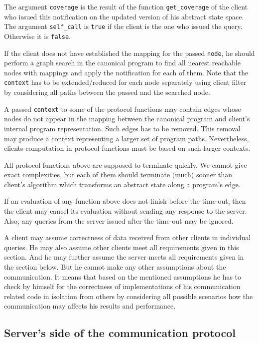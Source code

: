 \documentclass[envcountsame]{llncs}
\begin{document}
The argument \texttt{coverage} is the result of the function
\texttt{get\_coverage} of the client who issued this notification on the updated
version of his abstract state space. The argument \texttt{self\_call} is
\texttt{true} if the client is the one who issued the query. Otherwise it is
\texttt{false}.

If the client does not have established the mapping for the passed
\texttt{node}, he should perform a graph search in the canonical program to find
all nearest reachable nodes with mappings and apply the notification for each of
them. Note that the \texttt{context} has to be extended/reduced for each node
separately using client filter by considering all paths between the passed and
the searched node. \newline

A passed \texttt{context} to some of the protocol functions may contain edges
whose nodes do not appear in the mapping between the canonical program and
client's internal program representation. Such edges has to be removed. This
removal may produce a context representing a larger set of program paths.
Nevertheless, clients computation in protocol functions must be based on such
larger contexts.

All protocol functions above are supposed to terminate quickly. We cannot give
exact complexities, but each of them should terminate (much) sooner than
client's algorithm which transforms an abstract state along a program's edge.

If an evaluation of any function above does not finish before the time-out, then
the client may cancel its evaluation without sending any response to the server.
Also, any queries from the server issued after the time-out may be ignored.

A client may assume correctness of data received from other clients in
individual queries. He may also assume other clients meet all requirements given
in this section. And he may further assume the server meets all requirements
given in the section below. But he cannot make any other assumptions about the
communication. It means that based on the mentioned assumptions he has to check
by himself for the correctness of implementations of his communication related
code in isolation from others by considering all possible scenarios how the
communication may affects his results and performance.


\subsection{Server's side of the communication protocol}
\label{sec:ServerProtocol}
\end{document}
